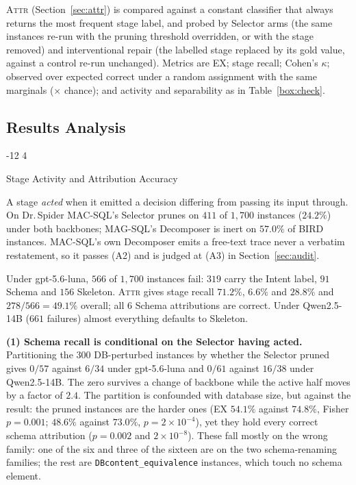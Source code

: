 \documentclass{llncs}
\makeatletter
\renewcommand\subsubsection{\@startsection{subsubsection}{3}{\z@}%
  {-12\p@ \@plus -4\p@ \@minus -4\p@}%
  {4\p@ \@plus 2\p@ \@minus 2\p@}%
  {\normalfont\normalsize\bfseries\boldmath\raggedright}}
\makeatother
\begin{document}
\textsc{Attr} (Section~\ref{sec:attr}) is compared against a constant
classifier that always returns the most frequent stage label, and probed by
Selector arms (the same instances re-run with the pruning threshold
overridden, or with the stage removed) and interventional repair (the labelled
stage replaced by its gold value, against a control re-run unchanged).
Metrics are EX; stage recall; Cohen's $\kappa$; observed over expected correct
under a random assignment with the same marginals ($\times$ chance); and
activity and separability as in Table~\ref{box:check}.

\subsection{Results Analysis}
\label{sec:results}

\subsubsection{Stage Activity and Attribution Accuracy}

A stage \emph{acted} when it emitted a decision differing from passing its
input through. On Dr.\,Spider MAC-SQL's Selector prunes on $411$ of $1{,}700$
instances ($24.2\%$) under both backbones; MAG-SQL's Decomposer is inert on
$57.0\%$ of BIRD instances. MAC-SQL's own Decomposer emits a free-text trace
never a verbatim restatement, so it passes (A2) and is judged at (A3) in
Section~\ref{sec:audit}.

Under gpt-5.6-luna, $566$ of $1{,}700$ instances fail: $319$ carry the Intent
label, $91$ Schema and $156$ Skeleton. \textsc{Attr} gives stage recall
$71.2\%$, $6.6\%$ and $28.8\%$ and $278/566 = 49.1\%$ overall; all $6$ Schema
attributions are correct. Under Qwen2.5-14B ($661$ failures) almost everything
defaults to Skeleton.

\noindent\textbf{(1) Schema recall is conditional on the Selector having
acted.} Partitioning the $300$ DB-perturbed instances by whether the Selector
pruned gives $0/57$ against $6/34$ under gpt-5.6-luna and $0/61$ against
$16/38$ under Qwen2.5-14B. The zero survives a
change of backbone while the active half moves by a factor of $2.4$. The partition is
confounded with database size, but against the result: the pruned instances
are the harder ones (EX $54.1\%$ against $74.8\%$, Fisher
$p = 0.001$; $48.6\%$ against $73.0\%$, $p = 2{\times}10^{-4}$), yet they
hold every correct schema attribution ($p = 0.002$ and $2{\times}10^{-8}$).
These fall mostly on the wrong family: one of the six and three of the
sixteen are on the two schema-renaming families; the rest are
\texttt{DBcontent\_equivalence} instances, which touch no schema element.
\end{document}
